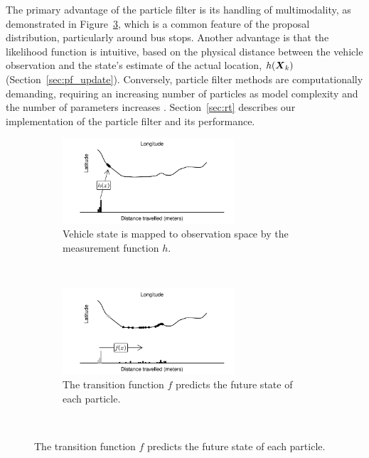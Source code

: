 The primary advantage of the particle filter is its handling of multimodality,
as demonstrated in Figure~\ref{fig:pf_state_predict},
which is a common feature of the proposal distribution, particularly around bus stops.
Another advantage is that the likelihood function is intuitive, based
on the physical distance between the vehicle observation and the state's
estimate of the actual location, $h(\mbox{$\boldsymbol{X}$}_k)$ (Section~\ref{sec:pf_update}).
Conversely, particle filter methods are computationally demanding,
requiring an increasing number of particles as model complexity and
the number of parameters increases \citep{Carpenter_1999}.
Section~\ref{sec:rt} describes our implementation of the particle filter
and its \rt performance.

\begin{figure}[p]
    \centering
    \begin{subfigure}[t]{1\textwidth}
        \centering
        \includegraphics[width=0.7\textwidth]{figures/03_particle_filter_1.pdf}
        \caption{
            Vehicle state is mapped to observation space by the
            measurement function $h$.   
        }
        \label{fig:pf_state_prev}
    \end{subfigure}\\
    \begin{subfigure}[t]{0.9\textwidth}
        \centering
        \includegraphics[width=0.7\textwidth]{figures/03_particle_filter_2.pdf}
        \caption{
            The transition function $f$ predicts the future state 
            of each particle.
        }
        \label{fig:pf_state_predict}
    \end{subfigure}\\

\end{figure}
